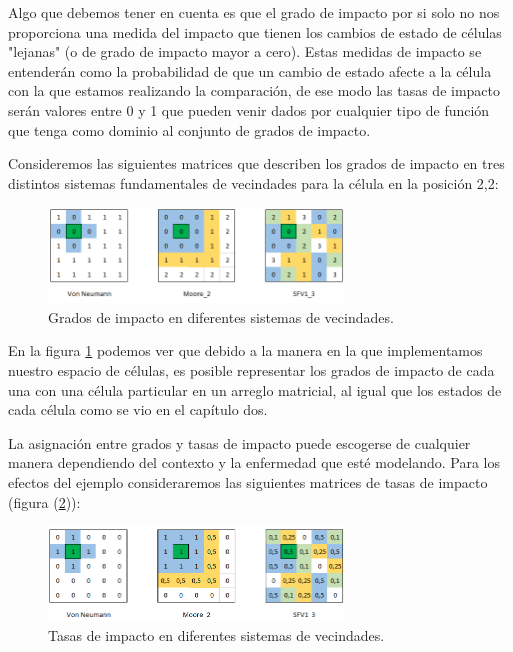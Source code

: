 Algo que debemos tener en cuenta es que el grado de impacto por si solo no nos proporciona una medida del impacto que tienen los cambios de estado de células "lejanas" (o de grado de impacto mayor a cero). Estas medidas de impacto se entenderán como la probabilidad de que un cambio de estado afecte a la célula con la que estamos realizando la comparación, de ese modo las tasas de impacto serán valores entre 0 y 1 que pueden venir dados por cualquier tipo de función que tenga como dominio al conjunto de grados de impacto.

\begin{example}
Consideremos las siguientes matrices que describen los grados de impacto en tres distintos sistemas fundamentales de vecindades para la célula en la posición 2,2:

\begin{figure}[h]\label{fig:gradoImpacto}
  \centering
    \includegraphics[width=0.7\textwidth]{Imagenes/ex315.PNG}
  \caption{Grados de impacto en diferentes sistemas de vecindades.}
\end{figure}

En la figura \ref{fig:gradoImpacto} podemos ver que debido a la manera en la que implementamos nuestro espacio de células, es posible representar los grados de impacto de cada una con una célula particular en un arreglo matricial, al igual que los estados de cada célula como se vio en el capítulo dos.

La asignación entre grados y tasas de impacto puede escogerse de cualquier manera dependiendo del contexto y la enfermedad que esté modelando. Para los efectos del ejemplo consideraremos las siguientes matrices de tasas de impacto (figura (\ref{fig:tasaImpacto})):

\begin{figure}[h]\label{fig:tasaImpacto}
  \centering
    \includegraphics[width=0.7\textwidth]{Imagenes/ex3152.PNG}
  \caption{Tasas de impacto en diferentes sistemas de vecindades.}
\end{figure}
\end{example}

